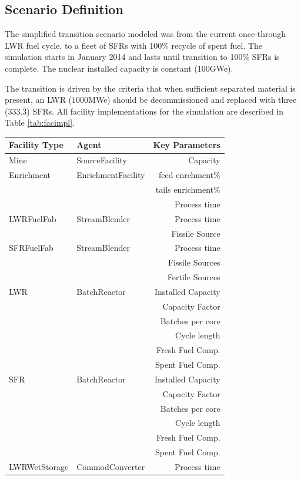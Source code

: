 \subsection{Scenario Definition}
The simplified transition scenario modeled was from the current once-through
\gls{LWR} fuel cycle, to a fleet of \glspl{SFR}
with 100\% recycle of spent fuel.  The simulation starts in January 2014 and
lasts until transition to 100\% \glspl{SFR} is complete. The nuclear installed
capacity is constant (100GWe).

The transition is driven by the criteria that when sufficient separated
material is present, an LWR ($1000$MWe) should be decommissioned and replaced
with three ($333.\bar{3}$) SFRs. All facility implementations for the 
simulation are described in Table \ref{tab:facimpl}.

\begin{table}
\centering
\begin{tabular}{|l|l|r|}
\hline
\textbf{Facility Type} &\textbf{Agent} & \textbf{Key Parameters}\\
\hline
Mine & SourceFacility & Capacity\\
\hline
Enrichment & EnrichmentFacility & feed enrchment\% \\
& & tails enrichment\% \\
& & Process time \\
\hline
LWRFuelFab & StreamBlender & Process time\\
& & Fissile Source\\
\hline
SFRFuelFab & StreamBlender  & Process time\\
& & Fissile Sources\\
& & Fertile Sources\\
\hline
LWR & BatchReactor & Installed Capacity \\
& & Capacity Factor \\
& & Batches per core \\ 
& & Cycle length\\
& & Fresh Fuel Comp. \\
& & Spent Fuel Comp. \\
\hline
SFR & BatchReactor & Installed Capacity\\
& & Capacity Factor \\
& & Batches per core \\ 
& & Cycle length\\
& & Fresh Fuel Comp. \\
& & Spent Fuel Comp. \\
\hline
LWRWetStorage & CommodConverter & Process time\\

\end{tabular}
\end{table}
